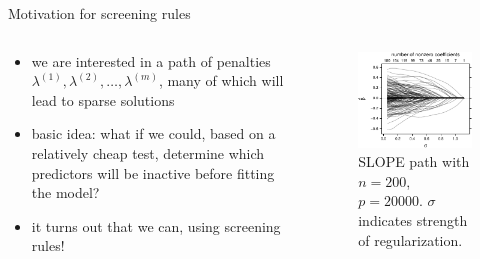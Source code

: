 \documentclass[10pt,ignorenonframetext]{beamer}
\begin{document}
\begin{frame}{Motivation for screening rules}
    \begin{columns}
        \begin{column}[t]{0.45\textwidth}
            \begin{itemize}
                \item<1->
                    we are interested in a \alert{path} of
                    penalties \(\lambda^{(1)}, \lambda^{(2)}, \dots, \lambda^{(m)}\),
                    many of which will lead to \alert{sparse}
                    solutions
                \item<2->
                    \alert{basic idea}: what if we could, based on a relatively \alert{cheap} test, determine which
                    predictors will be inactive before fitting the model?
                \item<3->
                    it turns out that we can, using screening rules!
            \end{itemize}
        \end{column}
        \begin{column}[t]{0.45\textwidth}
            \begin{figure}
            \centering
            \includegraphics[width=\linewidth]{figures/slope-path.pdf}
            \caption{SLOPE path with \(n=200\), \(p = 20000\). \(\sigma\) indicates strength of regularization.}
            \end{figure}
        \end{column}
    \end{columns}
\end{frame}
\end{document}
